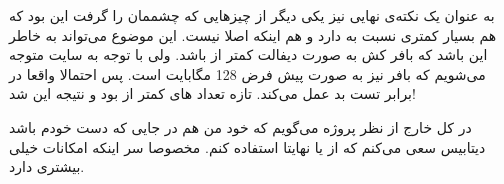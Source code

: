 به عنوان یک نکته‌ی نهایی نیز یکی دیگر از چیز‌هایی که چشممان را گرفت این بود که
 هم 
بسیار کمتری نسبت به
دارد و هم اینکه اصلا
نیست. این موضوع می‌تواند به خاطر این باشد که بافر کش
به صورت دیفالت کمتر از
باشد. ولی با توجه به
سایت متوجه می‌شویم که بافر
نیز به صورت پیش فرض 128 مگابایت است. پس احتمالا واقعا
در برابر تست
بد عمل می‌کند. تازه تعداد
های
کمتر از
بود و نتیجه این شد!

در کل خارج از نظر پروژه می‌گویم که خود من هم در جایی که دست خودم باشد دیتابیس سعی می‌کنم که از
 یا نهایتا 
استفاده کنم. مخصوصا سر اینکه
امکانات خیلی بیشتری دارد.
